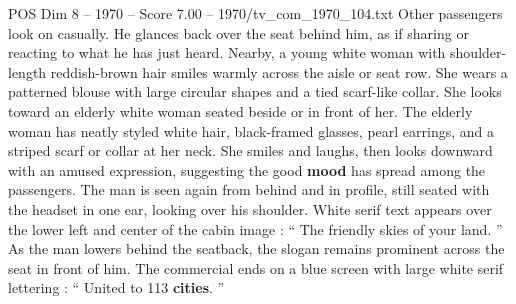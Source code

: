 \begin{textsample}{POS Dim 8 – 1970 – Score 7.00 – 1970/tv\_com\_1970\_104.txt}
Other passengers look on casually.
He glances back over the seat behind him, as if sharing or reacting to what he has just heard.
Nearby, a young white woman with shoulder-length reddish-brown hair smiles warmly across the aisle or seat row.
She wears a patterned blouse with large circular shapes and a tied scarf-like collar.
She looks toward an elderly white woman seated beside or in front of her.
The elderly woman has neatly styled white hair, black-framed glasses, pearl earrings, and a striped scarf or collar at her neck.
She smiles and laughs, then looks downward with an amused expression, suggesting the good \textbf{mood} has spread among the passengers.
The man is seen again from behind and in profile, still seated with the headset in one ear, looking over his shoulder.
White serif text appears over the lower left and center of the cabin image : “ The friendly skies of your land. ” As the man lowers behind the seatback, the slogan remains prominent across the seat in front of him.
The commercial ends on a blue screen with large white serif lettering : “ United to 113 \textbf{cities}. ”

\end{textsample}
